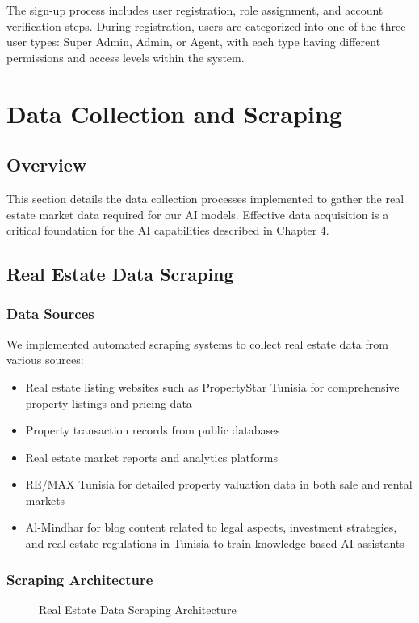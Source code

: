 

The sign-up process includes user registration, role assignment, and account verification steps. During registration, users are categorized into one of the three user types: Super Admin, Admin, or Agent, with each type having different permissions and access levels within the system.

\section{Data Collection and Scraping}
\subsection{Overview}
This section details the data collection processes implemented to gather the real estate market data required for our AI models. Effective data acquisition is a critical foundation for the AI capabilities described in Chapter 4.

\subsection{Real Estate Data Scraping}
\subsubsection{Data Sources}
We implemented automated scraping systems to collect real estate data from various sources:
\begin{itemize}
    \item Real estate listing websites such as PropertyStar Tunisia \cite{PropertyStarTunisia} for comprehensive property listings and pricing data
    \item Property transaction records from public databases
    \item Real estate market reports and analytics platforms
    \item RE/MAX Tunisia \cite{RemaxTunisia} for detailed property valuation data in both sale and rental markets
    \item Al-Mindhar \cite{AlMindhar} for blog content related to legal aspects, investment strategies, and real estate regulations in Tunisia to train knowledge-based AI assistants
\end{itemize}

\subsubsection{Scraping Architecture}
\begin{figure}[ht!]
    \centering
    \caption{Real Estate Data Scraping Architecture}
    \label{fig:scraping-architecture}
\end{figure}

